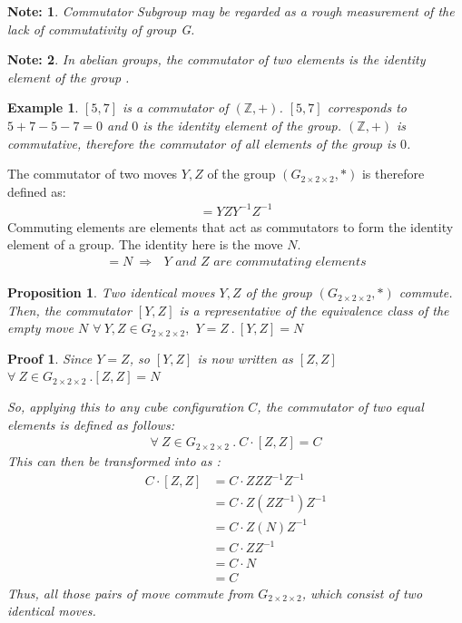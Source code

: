 \documentclass[12pt,a4paper]{article}
\theoremstyle{custom}
\newtheorem*{proposition}{Proposition}
\newtheorem*{proofcustom}{Proof}
\newtheorem*{note}{Note:}
\newtheorem*{example}{Example}
\newcommand{\Gtwo}{\ensuremath{G_{2\times 2\times 2}}}
\begin{document}
\begin{note}
    Commutator Subgroup may be regarded as a rough measurement of the lack of commutativity of group G.
\end{note}
\begin{note}
    In abelian groups, the commutator of two elements is the identity element of the group \cite{TD,hutchings2022mathematics}. 
\end{note}



\begin{example}

$[5,7]$ is a commutator of $(\mathbb{Z}, +)$. $[5,7]$ corresponds to $5+7-5-7 = 0$ and $0$ is the identity element of the group.  $(\mathbb{Z}, +)$ is commutative, therefore the commutator of all elements of the group is $0$.

\end{example}

\vspace{1cm}

The commutator of two moves $Y, Z$ of the group $(\Gtwo, \scriptstyle *)$ is therefore defined as:
\begin{align*}
[Y,Z]=YZY^{-1}Z^{-1}
\end{align*}
Commuting elements are elements that act as commutators to form the identity element of a group. The identity here is the move $N$.
\begin{align*}
[Y,Z]= N\ \Rightarrow \textit{ $Y$ and $Z$ are commutating elements}
\end{align*}
\begin{proposition}
Two identical moves $Y, Z$ of the group $(\Gtwo, \scriptstyle *)$ commute. Then, the commutator $[Y, Z]$ is a representative of the equivalence class of the empty move $N$
$\forall \ Y, Z \in \Gtwo,$
$Y = Z \ . \ [Y, Z] = N$
\end{proposition}

\begin{proofcustom}
    

Since $Y=Z$, so 
$[Y,Z]$ is now written as $[Z,Z]$  $\forall \ Z \in \Gtwo\ . [Z, Z] = N$

So, applying this to any cube configuration $C$, the commutator of two equal elements is defined as follows:
\begin{align*}
\forall \ Z \in \Gtwo\ . \ C \cdot [Z, Z] = C
\end{align*}
This can then be transformed into as :
\begin{align*}
C \cdot [Z, Z] & = C \cdot ZZZ^{-1}Z^{-1} \\
& = C \cdot Z(ZZ^{-1})Z^{-1} \\
& = C \cdot Z(N)Z^{-1} \\
& = C \cdot ZZ^{-1} \\
& = C \cdot N \\
& = C
\end{align*}
Thus, all those pairs of move commute from $\Gtwo$, which consist of two identical moves.
\end{proofcustom}
\end{document}
